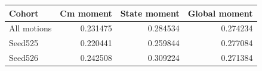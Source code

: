 \begin{tabular}{lrrr}
\toprule
Cohort & Cm moment & State moment & Global moment\\
\midrule
All motions & 0.231475 & 0.284534 & 0.274234\\
Seed525 & 0.220441 & 0.259844 & 0.277084\\
Seed526 & 0.242508 & 0.309224 & 0.271384\\
\bottomrule
\end{tabular}
